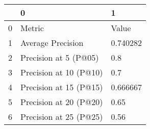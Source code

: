 \begin{tabular}{lll}
\toprule
{} &                       0 &         1 \\
\midrule
0 &                  Metric &     Value \\
1 &       Average Precision &  0.740282 \\
2 &   Precision at 5 (P@05) &       0.8 \\
3 &  Precision at 10 (P@10) &       0.7 \\
4 &  Precision at 15 (P@15) &  0.666667 \\
5 &  Precision at 20 (P@20) &      0.65 \\
6 &  Precision at 25 (P@25) &      0.56 \\
\bottomrule
\end{tabular}
